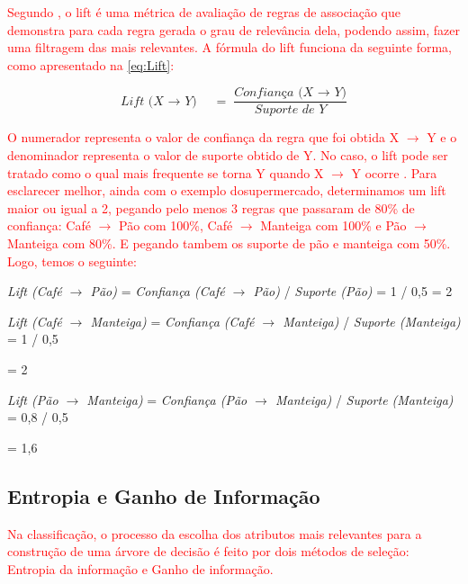 \par
\textcolor{red}{Segundo , o lift é uma métrica de avaliação de regras de associação que demonstra para cada regra gerada o grau de relevância dela, podendo assim, fazer uma filtragem das mais relevantes. A fórmula do lift funciona da seguinte forma, como apresentado na \autoref{eq:Lift}:}

\begin{equation}
    \label{eq:Lift}
        {\textit{Lift (X $\rightarrow$ Y)}\quad =\frac { \textit{Confiança (X $\rightarrow$ Y)} }{ \textit{Suporte de Y}} }
\end{equation}

\par
\textcolor{red}{O numerador representa o valor de confiança da regra que foi obtida X $\rightarrow$ Y e o denominador representa o valor de suporte obtido de Y. No caso, o lift pode ser tratado como o qual mais frequente se torna Y quando X $\rightarrow$ Y ocorre \cite{Gonsalves2004}. Para esclarecer melhor, ainda com o exemplo dosupermercado, determinamos um lift maior ou igual a 2, pegando pelo menos 3 regras que passaram de 80\% de confiança: Café $\rightarrow$ Pão com 100\%, Café $\rightarrow$ Manteiga com 100\% e Pão $\rightarrow$ Manteiga com 80\%. E pegando tambem os suporte de pão e manteiga com 50\%. Logo, temos o seguinte:}

\textit{Lift (Café $\rightarrow$ Pão)} = \textit{Confiança (Café $\rightarrow$ Pão)} /  \textit{Suporte (Pão)} = 1 / 0,5 = 2
    
\textit{Lift (Café $\rightarrow$ Manteiga)} = \textit{Confiança (Café $\rightarrow$ Manteiga)} /  \textit{Suporte (Manteiga)} = 1 / 0,5 

= 2
    
\textit{Lift (Pão $\rightarrow$ Manteiga)} = \textit{Confiança (Pão $\rightarrow$ Manteiga)} /  \textit{Suporte (Manteiga)} = 0,8 / 0,5 

= 1,6


\par
\textcolor{red}{}


\subsection{Entropia e Ganho de Informação}

\par
\textcolor{red}{Na classificação, o processo da escolha dos atributos mais relevantes para a construção de uma árvore de decisão é feito por dois métodos de seleção: Entropia da informação e Ganho de informação.}

